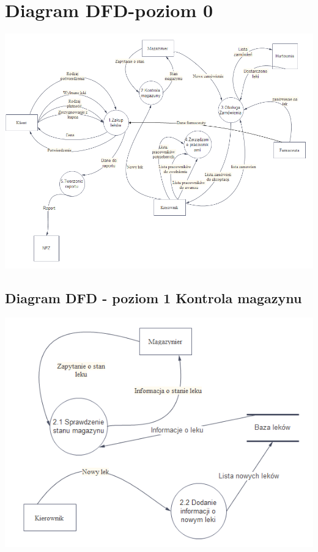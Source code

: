 \documentclass[a4paper, 11pt]{article}
\begin{document}
	\section{Diagram DFD-poziom 0}
		\includegraphics[scale=0.7]{dfdpoziom1.PNG} 
	
	\subsection{Diagram DFD - poziom 1 Kontrola magazynu}
		\includegraphics[scale=1]{kontrolaMagazynu.PNG} 
		
\end{document}
